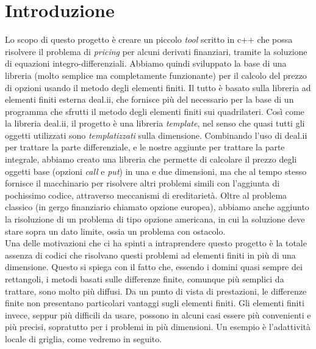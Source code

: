 \documentclass[a4paper,10pt]{report}
\theoremstyle{plain}
\theoremstyle{definition}
\theoremstyle{remark}
\begin{document}
	\clearpage
	\thispagestyle{empty}
	
	\clearpage

\clearpage
\thispagestyle{plain}
\par\vspace*{.35\textheight}{\raggedleft An approximate answer to the right problem is worth a good deal more than an exact answer to an approximate problem.\par}
\par\vspace{1cm}{\raggedleft John Tukey\par}

\tableofcontents
\listoffigures
\listoftables

\chapter*{Introduzione}

Lo scopo di questo progetto è creare un piccolo \emph{tool} scritto in c++ che possa risolvere il problema di \emph{pricing} per alcuni derivati finanziari, tramite la soluzione di equazioni integro-differenziali. Abbiamo quindi sviluppato la base di una libreria (molto semplice ma completamente funzionante) per il calcolo del prezzo di opzioni usando il metodo degli elementi finiti. Il tutto è basato sulla libreria ad elementi finiti esterna \textsf{deal.ii}, che fornisce pi\`u del necessario per la base di un programma che sfrutti il metodo degli elementi finiti sui quadrilateri. Cos\`i come la libreria \textsf{deal.ii}, il progetto \`e una libreria \emph{template}, nel senso che quasi tutti gli oggetti utilizzati sono \emph{templatizzati} sulla dimensione. Combinando l'uso di \textsf{deal.ii} per trattare la parte differenziale, e le nostre aggiunte per trattare la parte integrale, abbiamo creato una libreria che permette di calcolare il prezzo degli oggetti base (opzioni \emph{call} e \emph{put}) in una e due dimensioni, ma che al tempo stesso fornisce il macchinario per risolvere altri problemi simili con l'aggiunta di pochissimo codice, attraverso meccanismi di ereditarietà. Oltre al problema classico (in gergo finanziario chiamato opzione europea), abbiamo anche aggiunto la risoluzione di un problema di tipo opzione americana, in cui la soluzione deve stare sopra un dato limite, ossia un problema con ostacolo.\\

Una delle motivazioni che ci ha spinti a intraprendere questo progetto è la totale assenza di codici che risolvano questi problemi ad elementi finiti in più di una dimensione. Questo si spiega con il fatto che, essendo i domini quasi sempre dei rettangoli, i metodi basati sulle differenze finite, comunque pi\`u semplici da trattare, sono molto più diffusi. Da un punto di vista di prestazioni, le differenze finite non presentano particolari vantaggi sugli elementi finiti. Gli elementi finiti invece, seppur più difficili da usare, possono in alcuni casi essere più convenienti e pi\`u precisi, sopratutto per i problemi in più dimensioni. Un esempio è l'adattività locale di griglia, come vedremo in seguito.\\
\end{document}
